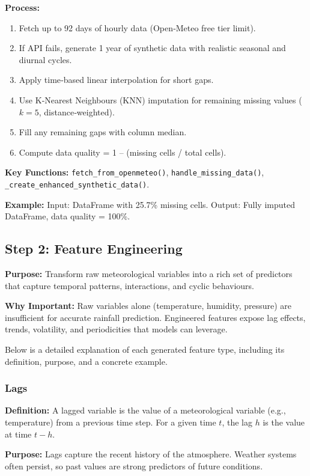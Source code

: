 \documentclass[12pt]{article}
\begin{document}
	\textbf{Process:}
	\begin{enumerate}
		\item Fetch up to 92 days of hourly data (Open‑Meteo free tier limit).
		\item If API fails, generate 1 year of synthetic data with realistic seasonal and diurnal cycles.
		\item Apply time‑based linear interpolation for short gaps.
		\item Use K‑Nearest Neighbours (KNN) imputation for remaining missing values ($k=5$, distance‑weighted).
		\item Fill any remaining gaps with column median.
		\item Compute data quality = 1 – (missing cells / total cells).
	\end{enumerate}
	
	\textbf{Key Functions:} \texttt{fetch\_from\_openmeteo()}, \texttt{handle\_missing\_data()}, \texttt{\_create\_enhanced\_synthetic\_data()}.
	
	\textbf{Example:} Input: DataFrame with 25.7\% missing cells. Output: Fully imputed DataFrame, data quality = 100\%.
	
	\subsection{Step 2: Feature Engineering}
	\textbf{Purpose:} Transform raw meteorological variables into a rich set of predictors that capture temporal patterns, interactions, and cyclic behaviours.
	
	\textbf{Why Important:} Raw variables alone (temperature, humidity, pressure) are insufficient for accurate rainfall prediction. Engineered features expose lag effects, trends, volatility, and periodicities that models can leverage.
	
	Below is a detailed explanation of each generated feature type, including its definition, purpose, and a concrete example.
	
	\subsubsection{Lags}
	\textbf{Definition:} A lagged variable is the value of a meteorological variable (e.g., temperature) from a previous time step. For a given time $t$, the lag $h$ is the value at time $t-h$.
	
	\textbf{Purpose:} Lags capture the recent history of the atmosphere. Weather systems often persist, so past values are strong predictors of future conditions.
	
\end{document}
